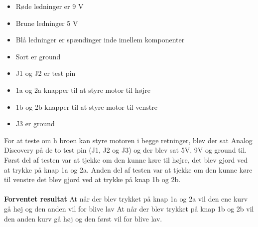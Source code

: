 \begin{itemize}
	\item Røde ledninger er 9 V
	\item	Brune ledninger 5 V
	\item	Blå ledninger er spændinger inde imellem komponenter
	\item	Sort er ground
	\item	J1 og J2 er test pin 
	\item	1a og 2a knapper til at styre motor til højre
	\item	1b og 2b knapper til at styre motor til venstre 
	\item	J3 er ground
	
	\end{itemize}

For at teste om h broen kan styre motoren i begge retninger, blev der sat Analog Discovery på de to test pin (J1, J2 og J3) og der blev sat 5V, 9V og ground til. 
Først del af testen var at tjekke om den kunne køre til højre, det blev gjord ved at trykke på knap 1a og 2a.
Anden del af testen var at tjekke om den kunne køre til venstre det blev gjord ved at trykke på knap 1b og 2b.
\\
\\
\textbf{Forventet resultat}
At når der blev trykket på knap 1a og 2a vil den ene kurv gå høj og den anden vil for blive lav
At når der blev trykket på knap 1b og 2b vil den anden kurv gå høj og den først vil for blive lav.
\\
\\

